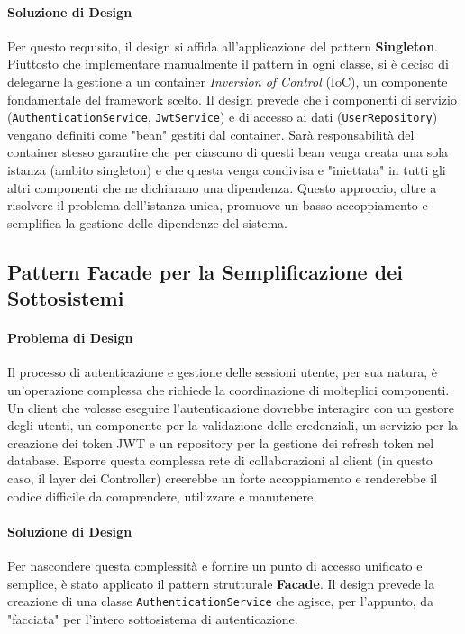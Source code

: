 \documentclass[12pt,a4paper,openright,twoside]{book}
\begin{document}
\paragraph{Soluzione di Design}
Per questo requisito, il design si affida all'applicazione del pattern \textbf{Singleton}. Piuttosto che implementare manualmente il pattern in ogni classe, si è deciso di delegarne la gestione a un container \textit{Inversion of Control} (IoC), un componente fondamentale del framework scelto. Il design prevede che i componenti di servizio (\texttt{AuthenticationService}, \texttt{JwtService}) e di accesso ai dati (\texttt{UserRepository}) vengano definiti come "bean" gestiti dal container. Sarà responsabilità del container stesso garantire che per ciascuno di questi bean venga creata una sola istanza (ambito singleton) e che questa venga condivisa e "iniettata" in tutti gli altri componenti che ne dichiarano una dipendenza. Questo approccio, oltre a risolvere il problema dell'istanza unica, promuove un basso accoppiamento e semplifica la gestione delle dipendenze del sistema.

\subsection{Pattern Facade per la Semplificazione dei Sottosistemi}
\label{subsec:design_facade}

\paragraph{Problema di Design}
Il processo di autenticazione e gestione delle sessioni utente, per sua natura, è un'operazione complessa che richiede la coordinazione di molteplici componenti. Un client che volesse eseguire l'autenticazione dovrebbe interagire con un gestore degli utenti, un componente per la validazione delle credenziali, un servizio per la creazione dei token JWT e un repository per la gestione dei refresh token nel database. Esporre questa complessa rete di collaborazioni al client (in questo caso, il layer dei Controller) creerebbe un forte accoppiamento e renderebbe il codice difficile da comprendere, utilizzare e manutenere.

\paragraph{Soluzione di Design}
Per nascondere questa complessità e fornire un punto di accesso unificato e semplice, è stato applicato il pattern strutturale \textbf{Facade}. Il design prevede la creazione di una classe \texttt{AuthenticationService} che agisce, per l'appunto, da "facciata" per l'intero sottosistema di autenticazione.
\end{document}
